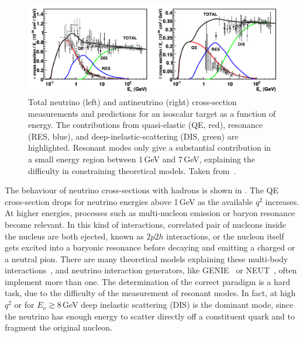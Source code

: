 \begin{figure}
	\centering
	\includegraphics[width=\textwidth]{pics/qe_xsec.pdf}
	\caption{Total neutrino (left) and antineutrino (right) cross-section measurements and predictions for an isoscalar target %
		as a function of energy. The contributions from quasi-elastic (QE, red), resonance (RES, blue), %
		and deep-inelastic-scattering (DIS, green) are highlighted.
		Resonant modes only give a substantial contribution in a small energy region between 1\,GeV and 7\,GeV, %
		explaining the difficulty in constraining theoretical models.
		Taken from~.}
	\label{fig:xsec}
\end{figure}

The behaviour of neutrino cross-sections with hadrons is shown in .
The QE cross-section drops for neutrino energies above 1\,GeV as the available $q^2$ increases. 
At higher energies, processes such as multi-nucleon emission or baryon resonance become relevant.
In this kind of interactions, correlated pair of nucleons inside the nucleus are both ejected, known as $2p2h$ interactions, %
or the nucleon itself gets excited into a baryonic resonance before decaying and emitting a charged or a neutral pion.
There are many theoretical models explaining these multi-body interactions~\cite{Rein:1980wg, Martini:2009uj, Nieves:2011pp}, %
and neutrino interaction generators, like GENIE~\cite{Andreopoulos:2009rq} or NEUT~\cite{Hayato:2002sd}, %
often implement more than one.
The determination of the correct paradigm is a hard task, due to the difficulty of the measurement of resonant modes.
In fact, at high $q^2$ or for $E_\nu \gtrsim 8$\,GeV deep inelastic scattering (DIS) is the dominant mode, since %
the neutrino has enough energy to scatter directly off a constituent quark and to fragment the original nucleon.
